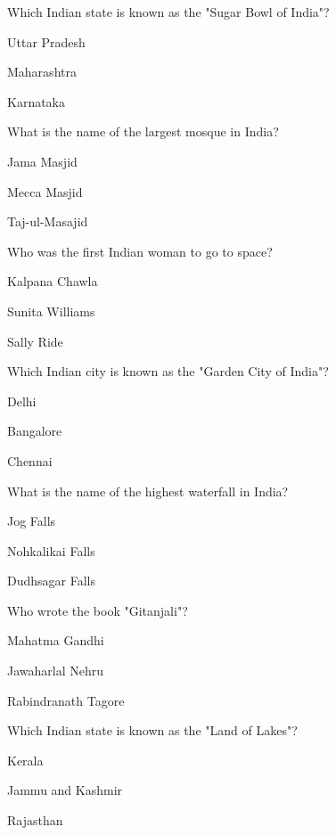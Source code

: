 \begin{enhancedmcq}{Which Indian state is known as the "Sugar Bowl of India"?}
\item Uttar Pradesh
\item Maharashtra
\item Karnataka

\end{enhancedmcq}
\begin{enhancedmcq}{What is the name of the largest mosque in India?}
\item Jama Masjid
\item Mecca Masjid
\item Taj-ul-Masajid

\end{enhancedmcq}
\begin{enhancedmcq}{Who was the first Indian woman to go to space?}
\item Kalpana Chawla
\item Sunita Williams
\item Sally Ride

\end{enhancedmcq}
\begin{enhancedmcq}{Which Indian city is known as the "Garden City of India"?}
\item Delhi
\item Bangalore
\item Chennai

\end{enhancedmcq}
\begin{enhancedmcq}{What is the name of the highest waterfall in India?}
\item Jog Falls
\item Nohkalikai Falls
\item Dudhsagar Falls

\end{enhancedmcq}
\begin{enhancedmcq}{Who wrote the book "Gitanjali"?}
\item Mahatma Gandhi
\item Jawaharlal Nehru
\item Rabindranath Tagore

\end{enhancedmcq}
\begin{enhancedmcq}{Which Indian state is known as the "Land of Lakes"?}
\item Kerala
\item Jammu and Kashmir
\item Rajasthan

\end{enhancedmcq}

